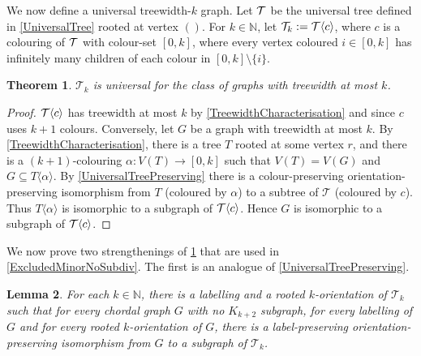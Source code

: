 \documentclass[a4paper,11pt]{article}
\theoremstyle{plain}
\newtheorem{thm}{Theorem}[section]
\newtheorem{lem}[thm]{Lemma}
\theoremstyle{definition}
\newcommand{\T}{\ensuremath{\protect{\mathcal{T}}}}
\newcommand{\TT}{\mathcal{T}}
\newcommand{\NN}{\mathbb{N}}
\newcommand{\GGG}[2]{#1\langle{#2}\rangle}
\begin{document}
We now define a universal treewidth-$k$ graph. Let $\T$ be the universal tree defined in \cref{UniversalTree} rooted at vertex $()$. For $k\in\mathbb{N}$, let $\TT_k := \GGG{\T}{c}$, where $c$ is a colouring of $\T$ with colour-set $[0,k]$, where every vertex coloured $i\in[0,k]$ has infinitely many children of each colour in $[0,k]\setminus\{i\}$. 

\begin{thm}
\label{TreewidthUniversal}
$\TT_k$ is universal for the class of graphs with treewidth at most $k$.
\end{thm}

\begin{proof}
$\GGG{\T}{c}$ has treewidth at most $k$ by \cref{TreewidthCharacterisation} and since $c$ uses $k+1$ colours. Conversely, let $G$ be a graph with treewidth at most $k$. By \cref{TreewidthCharacterisation}, there is a tree $T$ rooted at some vertex $r$, and there is a $(k+1)$-colouring $\alpha:V(T)\to[0,k]$ such that $V(T)=V(G)$ and $G\subseteq \GGG{T}{\alpha}$. By \cref{UniversalTreePreserving} there is a colour-preserving orientation-preserving isomorphism from $T$ (coloured by $\alpha$) to a subtree of $\TT$ (coloured by $c$). Thus $\GGG{T}{\alpha}$ is isomorphic to a subgraph of $\GGG{\T}{c}$. Hence $G$ is isomorphic to a subgraph of $\GGG{\T}{c}$.
\end{proof}

We now prove two strengthenings of \cref{TreewidthUniversal} that are used in \cref{ExcludedMinorNoSubdiv}. The first is an analogue of \cref{UniversalTreePreserving}. 

\begin{lem}
\label{TreewidthUniversalPreserving}
For each $k\in\NN$, there is a labelling and a rooted $k$-orientation of $\TT_k$ such that for every chordal graph $G$ with no $K_{k+2}$ subgraph, for every labelling of $G$ and for every rooted $k$-orientation of $G$, there is a label-preserving orientation-preserving isomorphism from $G$ to a subgraph of $\TT_k$. 
\end{lem}
\end{document}
